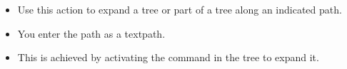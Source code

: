  \begin{itemize}
\item Use this action to expand a tree or part of a tree along an indicated path.
\item You enter the path as a textpath.
\item This is achieved by activating the command in the tree to expand it. 
\end{itemize}

   